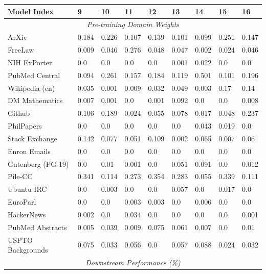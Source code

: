 \begin{table}[!ht]
    \centering
    \begin{tabular}{lllllllll}
    \toprule
        \textbf{Model Index} & \textbf{9} & \textbf{10} & \textbf{11} & \textbf{12} & \textbf{13} & \textbf{14} & \textbf{15} & \textbf{16} \\
        \midrule
        \multicolumn{9}{c}{\textit{Pre-training Domain Weights}} \\
        ArXiv & 0.184 & 0.226 & 0.107 & 0.139 & 0.101 & 0.099 & 0.251 & 0.147 \\ 
        FreeLaw & 0.009 & 0.046 & 0.276 & 0.048 & 0.047 & 0.002 & 0.024 & 0.046 \\ 
        NIH ExPorter & 0.0 & 0.0 & 0.0 & 0.0 & 0.001 & 0.022 & 0.0 & 0.0 \\ 
        PubMed Central & 0.094 & 0.261 & 0.157 & 0.184 & 0.119 & 0.501 & 0.101 & 0.196 \\ 
        Wikipedia (en) & 0.035 & 0.001 & 0.009 & 0.032 & 0.049 & 0.003 & 0.17 & 0.14 \\ 
        DM Mathematics & 0.007 & 0.001 & 0.0 & 0.001 & 0.092 & 0.0 & 0.0 & 0.008 \\ 
        Github & 0.106 & 0.189 & 0.024 & 0.055 & 0.078 & 0.017 & 0.048 & 0.237 \\ 
        PhilPapers & 0.0 & 0.0 & 0.0 & 0.0 & 0.0 & 0.043 & 0.019 & 0.0 \\ 
        Stack Exchange & 0.142 & 0.077 & 0.051 & 0.109 & 0.002 & 0.065 & 0.007 & 0.06 \\ 
        Enron Emails & 0.0 & 0.0 & 0.0 & 0.0 & 0.0 & 0.0 & 0.0 & 0.0 \\ 
        Gutenberg (PG-19) & 0.0 & 0.01 & 0.001 & 0.0 & 0.051 & 0.091 & 0.0 & 0.012 \\ 
        Pile-CC & 0.341 & 0.114 & 0.273 & 0.354 & 0.283 & 0.055 & 0.339 & 0.111 \\ 
        Ubuntu IRC & 0.0 & 0.003 & 0.0 & 0.0 & 0.057 & 0.0 & 0.017 & 0.0 \\ 
        EuroParl & 0.0 & 0.0 & 0.003 & 0.003 & 0.0 & 0.006 & 0.0 & 0.0 \\ 
        HackerNews & 0.002 & 0.0 & 0.034 & 0.0 & 0.0 & 0.0 & 0.0 & 0.001 \\ 
        PubMed Abstracts & 0.005 & 0.039 & 0.009 & 0.075 & 0.061 & 0.007 & 0.0 & 0.01 \\ 
        USPTO Backgrounds & 0.075 & 0.033 & 0.056 & 0.0 & 0.057 & 0.088 & 0.024 & 0.032 \\
        \midrule
        \multicolumn{9}{c}{\textit{Downstream Performance (\%)}} \\

\end{tabular}
\end{table}
